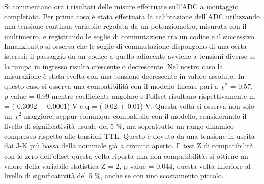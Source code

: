 \documentclass[journal]{IEEEtran}
\begin{document}
Si commentano ora i risultati delle misure effettuate sull'ADC a montaggio completato. Per prima cosa è stata effettuata la calibrazione dell'ADC utilizzando una tensione continua variabile regolata da un potenziometro, misurata con il multimetro, e registrando le soglie di commutazione tra un codice e il successivo. Innanzitutto si osserva che le soglie di commutazione dispongono di una certa isteresi: il passaggio da un codice a quello adiacente avviene a tensioni diverse se la rampa in ingresso risulta crescente o decrescente. Nel nostro caso la misurazione è stata svolta con una tensione decrescente in valore assoluto. In questo caso si osserva una compatibilità con il modello lineare pari a $\chi^2$ = 0.57, p-value = 0.99 mentre coefficiente angolare e l'offset risultano rispettivamente m = (-0.3092 $\pm$ 0.0001) V e q = (-0.02 $\pm$ 0.01) V. Questa volta si osserva non solo un $\chi^2$ maggiore, seppur comunque compatibile con il modello, considerando il livello di significatività usuale del 5 \%, ma soprattutto un range dinamico compresso rispetto alle tensioni TTL. Questo è dovuto da una tensione in uscita dai J-K più bassa della nominale già a circuito aperto. Il test Z di compatibilità con lo zero dell'offset questa volta riporta una non compatibilità: si ottiene un valore della variabile statistica Z = 2, p-value = 0.044, questa volta inferiore al livello di significatività del 5 \%, anche se con uno scostamento piccolo.
\\
\end{document}
